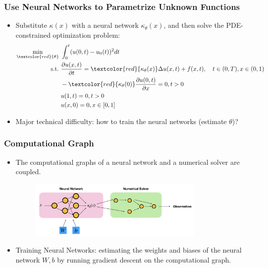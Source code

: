 \documentclass{beamer}
\begin{document}
\begin{frame}
	\frametitle{Use Neural Networks to Parametrize Unknown Functions}
	
\begin{itemize}
	\item Substitute $\kappa(x)$ with a neural network $\kappa_\theta(x)$, and then solve the PDE-constrained optimization problem:
	\begin{align*}
\min_{\textcolor{red}{\theta}}\ & \int_{0}^t ( u(0, t)- u_0(t))^2 dt\\
\mathrm{s.t.}\ & \frac{\partial u(x, t)}{\partial t} = \textcolor{red}{\kappa_\theta(x)}\Delta u(x, t) + f(x, t), \quad t\in (0,T), x\in (0,1) \\
& -\textcolor{red}{\kappa_\theta(0)}\frac{\partial u(0,t)}{\partial x} = 0, t>0\\
& u(1, t) = 0, t>0\\
& u(x, 0) = 0, x\in [0,1]
\end{align*}
\item Major technical difficulty: how to train the neural networks (estimate $\theta$)?
\end{itemize}
\end{frame}




\begin{frame}
	\frametitle{Computational Graph}
	
	\begin{itemize}
		\item The computational graphs of a neural network and a  numerical solver are coupled. 
		\begin{figure}[hbt]
  \includegraphics[width=0.8\textwidth]{figures/solver}
\end{figure}
		\item  Training Neural Networks: estimating the weights and biases of the neural network $W, b$ by running gradient descent on the computational graph. 
	\end{itemize}

\end{frame}
\end{document}
